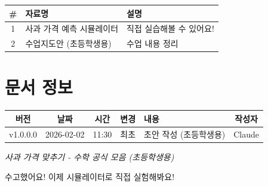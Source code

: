\documentclass[12pt,a4paper]{article}
\begin{document}
\begin{center}
\begin{tabular}{|c|l|l|}
\hline
\textbf{\#} & \textbf{자료명} & \textbf{설명} \\
\hline
1 & 사과 가격 예측 시뮬레이터 & 직접 실습해볼 수 있어요! \\
\hline
2 & 수업지도안 (초등학생용) & 수업 내용 정리 \\
\hline
\end{tabular}
\end{center}

\section{ 문서 정보}

\begin{center}
\begin{tabular}{|c|c|c|c|l|c|}
\hline
\textbf{버전} & \textbf{날짜} & \textbf{시간} & \textbf{변경} & \textbf{내용} & \textbf{작성자} \\
\hline
v1.0.0.0 & 2026-02-02 & 11:30 & 최초 & 초안 작성 (초등학생용) & Claude \\
\hline
\end{tabular}
\end{center}

\vspace{1cm}
\begin{center}
\Large
\textit{ 사과 가격 맞추기 - 수학 공식 모음 (초등학생용)}

\vspace{0.5cm}
\normalsize
{} 수고했어요! 이제 시뮬레이터로 직접 실험해봐요!
\end{center}
\end{document}

